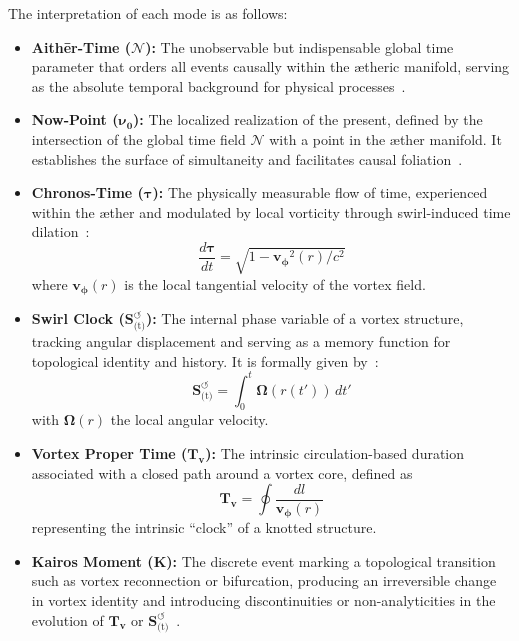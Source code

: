\noindent The interpretation of each mode is as follows:
\begin{itemize}
    \item \textbf{Aithēr-Time ($\boldsymbol{\mathcal{N}}$):} The unobservable but indispensable global time parameter that orders all events causally within the ætheric manifold, serving as the absolute temporal background for physical processes~\cite{VAM-8, VAM-13}.

    \item \textbf{Now-Point ($\boldsymbol{\nu_0}$):} The localized realization of the present, defined by the intersection of the global time field $\boldsymbol{\mathcal{N}}$ with a point in the æther manifold. It establishes the surface of simultaneity and facilitates causal foliation~\cite{VAM-8, VAM-13}.

    \item \textbf{Chronos-Time ($\boldsymbol{\tau}$):} The physically measurable flow of time, experienced within the æther and modulated by local vorticity through swirl-induced time dilation~\cite{VAM-1, VAM-8}:
    \[
        \frac{d\boldsymbol{\tau}}{dt} = \sqrt{1 - \boldsymbol{v_\phi}^2(r)/c^2}
    \]
    where $\boldsymbol{v_\phi}(r)$ is the local tangential velocity of the vortex field.

    \item \textbf{Swirl Clock ($\boldsymbol{S}^{\boldsymbol{\circlearrowleft}}_\text{(t)}$):} The internal phase variable of a vortex structure, tracking angular displacement and serving as a memory function for topological identity and history. It is formally given by~\cite{VAM-2, VAM-13}:
    \[
        \boldsymbol{S}^{\boldsymbol{\circlearrowleft}}_\text{(t)} = \int_{0}^{t} \boldsymbol{\Omega}(r(t'))\, dt'
    \]
    with $\boldsymbol{\Omega}(r)$ the local angular velocity.

    \item \textbf{Vortex Proper Time ($\boldsymbol{T_v}$):} The intrinsic circulation-based duration associated with a closed path around a vortex core, defined as~\cite{VAM-2, VAM-13}
    \[
        \boldsymbol{T_v} = \oint \frac{dl}{\boldsymbol{v_\phi}(r)}
    \]
    representing the intrinsic “clock” of a knotted structure.

    \item \textbf{Kairos Moment ($\mathbb{\boldsymbol{K}}$):}
    The discrete event marking a topological transition such as vortex reconnection or bifurcation, producing an irreversible change in vortex identity and introducing discontinuities or non-analyticities in the evolution of $\boldsymbol{T_v}$ or $\boldsymbol{S}^{\boldsymbol{\circlearrowleft}}_\text{(t)}$~\cite{VAM-13, VAM-15}.
\end{itemize}

